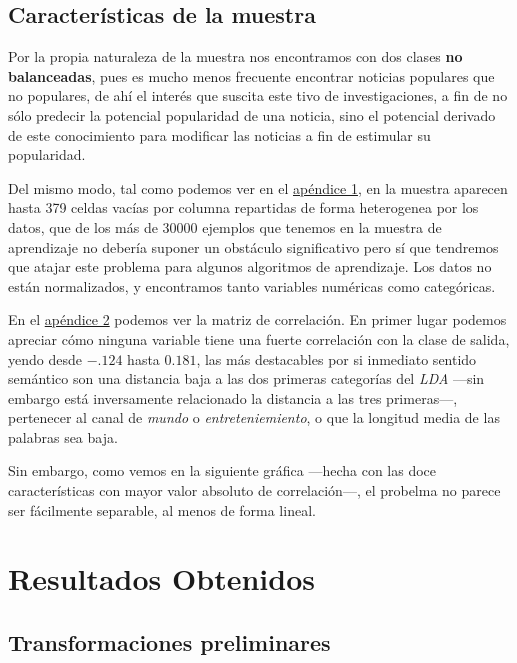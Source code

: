 \documentclass{article}
\newcommand{\img}[2]{
\noindent\makebox[\textwidth][c]{\texttt{[image: \#1]}}%
}
\begin{document}
\subsection{Características de la muestra}

Por la propia naturaleza de la muestra nos encontramos con dos clases \textbf{no balanceadas}, pues es mucho menos frecuente encontrar noticias populares que no populares, de ahí el interés que suscita este tivo de investigaciones, a fin de no sólo predecir la potencial popularidad de una noticia, sino el potencial derivado de este conocimiento para modificar las noticias a fin de estimular su popularidad. 

Del mismo modo, tal como podemos ver en el \hyperref[subsec:stats]{apéndice 1}, en la muestra aparecen hasta 379 celdas vacías por columna repartidas de forma heterogenea por los datos, que de los más de 30000 ejemplos que tenemos en la muestra de aprendizaje no debería suponer un obstáculo significativo pero sí que tendremos que atajar este problema para algunos algoritmos de aprendizaje. Los datos no están normalizados, y encontramos tanto variables numéricas como categóricas.

En el \hyperref[subsec:corr]{apéndice 2} podemos ver la matriz de correlación. En primer lugar podemos apreciar cómo ninguna variable tiene una fuerte correlación con la clase de salida, yendo desde $-.124$ hasta $0.181$, las más destacables por si inmediato sentido semántico son una distancia baja a las dos primeras categorías del \textit{LDA} ---sin embargo está inversamente relacionado la distancia a las tres primeras---, pertenecer al canal de \textit{mundo} o \textit{entreteniemiento}, o que la longitud media de las palabras sea baja.

Sin embargo, como vemos en la siguiente gráfica ---hecha con las doce características con mayor valor absoluto de correlación---, el probelma no parece ser fácilmente separable, al menos de forma lineal.

\img{para}{1}

\section{Resultados Obtenidos}

\subsection{Transformaciones preliminares}
\label{subsec:preproc1}
\end{document}
